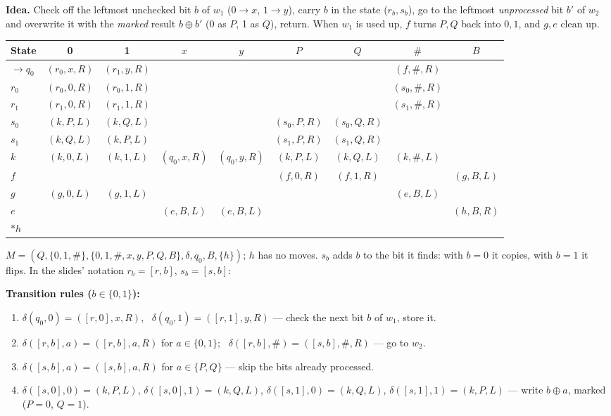 \documentclass[11pt,a4paper]{article}
\begin{document}
\begin{solution}
\textbf{Idea.} Check off the leftmost unchecked bit $b$ of $w_1$ ($0\to x$, $1\to y$), carry $b$ in the state ($r_b,s_b$), go to the leftmost \emph{unprocessed} bit $b'$ of $w_2$ and overwrite it with the \emph{marked} result $b\oplus b'$ (0 as $P$, 1 as $Q$), return. When $w_1$ is used up, $f$ turns $P,Q$ back into $0,1$, and $g,e$ clean up.
\begin{center}\footnotesize\setlength{\tabcolsep}{3.5pt}\begin{tabular}{l|cccccccc}\toprule State & 0 & 1 & $x$ & $y$ & $P$ & $Q$ & $\#$ & $B$\\\midrule
$\to q_0$ & $(r_0,x,R)$ & $(r_1,y,R)$ & & & & & $(f,\#,R)$ & \\
$r_0$ & $(r_0,0,R)$ & $(r_0,1,R)$ & & & & & $(s_0,\#,R)$ & \\
$r_1$ & $(r_1,0,R)$ & $(r_1,1,R)$ & & & & & $(s_1,\#,R)$ & \\
$s_0$ & $(k,P,L)$ & $(k,Q,L)$ & & & $(s_0,P,R)$ & $(s_0,Q,R)$ & & \\
$s_1$ & $(k,Q,L)$ & $(k,P,L)$ & & & $(s_1,P,R)$ & $(s_1,Q,R)$ & & \\
$k$ & $(k,0,L)$ & $(k,1,L)$ & $(q_0,x,R)$ & $(q_0,y,R)$ & $(k,P,L)$ & $(k,Q,L)$ & $(k,\#,L)$ & \\
$f$ & & & & & $(f,0,R)$ & $(f,1,R)$ & & $(g,B,L)$\\
$g$ & $(g,0,L)$ & $(g,1,L)$ & & & & & $(e,B,L)$ & \\
$e$ & & & $(e,B,L)$ & $(e,B,L)$ & & & & $(h,B,R)$\\
$*h$ & & & & & & & & \\\bottomrule\end{tabular}\end{center}
$M=(Q,\{0,1,\#\},\{0,1,\#,x,y,P,Q,B\},\delta,q_0,B,\{h\})$; $h$ has no moves. $s_b$ adds $b$ to the bit it finds: with $b=0$ it copies, with $b=1$ it flips. In the slides' notation $r_b=[r,b]$, $s_b=[s,b]$:
\par\noindent\textbf{Transition rules ($b\in\{0,1\}$):}
{\small\begin{enumerate}[label=\arabic*.,itemsep=0pt]
\item $\delta(q_0,0)=([r,0],x,R)$, \ $\delta(q_0,1)=([r,1],y,R)$ --- check the next bit $b$ of $w_1$, store it.
\item $\delta([r,b],a)=([r,b],a,R)$ for $a\in\{0,1\}$; \ $\delta([r,b],\#)=([s,b],\#,R)$ --- go to $w_2$.
\item $\delta([s,b],a)=([s,b],a,R)$ for $a\in\{P,Q\}$ --- skip the bits already processed.
\item $\delta([s,0],0)=(k,P,L)$, $\delta([s,0],1)=(k,Q,L)$, $\delta([s,1],0)=(k,Q,L)$, $\delta([s,1],1)=(k,P,L)$ --- write $b\oplus a$, marked ($P=0$, $Q=1$).

\end{enumerate}}
\end{solution}
\end{document}
